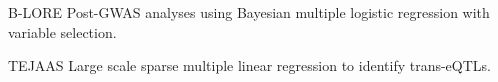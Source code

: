 


\begin{cvskills}


\cvskill
{B-LORE} %
{Post-GWAS analyses using Bayesian multiple logistic regression with variable selection.} %


\cvskill
{TEJAAS} %
{Large scale sparse multiple linear regression to identify trans-eQTLs.} %


\end{cvskills}
